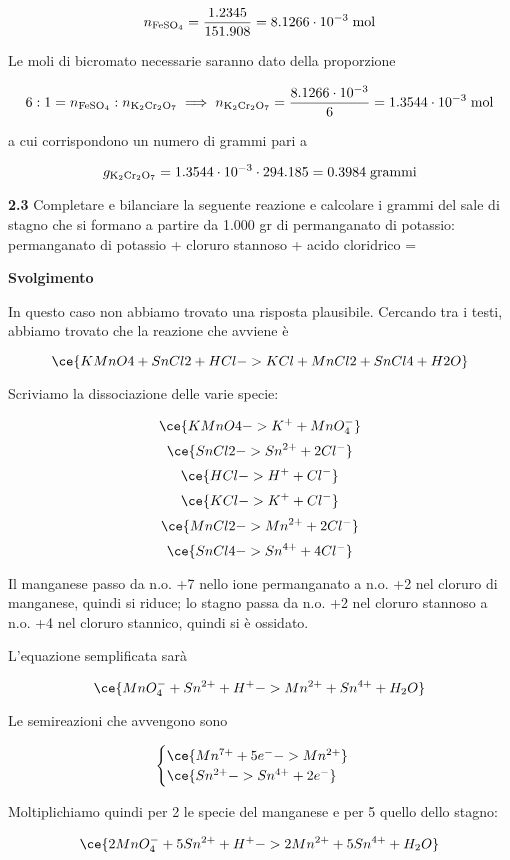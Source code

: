 $$n_{\rm FeSO_4}=\frac{1.2345}{151.908}=8.1266 \cdot 10^{-3} \; \rm mol$$

Le moli di bicromato necessarie saranno dato della proporzione

$$6:1=n_{\rm FeSO_4}:n_{\rm K_2Cr_2O_7}
\implies
n_{\rm K_2Cr_2O_7}
=\frac{8.1266 \cdot 10^{-3}}{6}
=1.3544 \cdot 10^{-3} \; \rm mol$$

a cui corrispondono un numero di grammi pari a

$$g_{\rm K_2Cr_2O_7}
=1.3544 \cdot 10^{-3} \cdot 294.185
=0.3984 \; \rm grammi$$

\vspace{0.2cm}\textbf{2.3} Completare e bilanciare la seguente reazione e calcolare i grammi del sale di stagno che si formano a partire da 1.000 gr di permanganato di potassio: 
permanganato di potassio + cloruro stannoso + acido cloridrico =

\vspace{0.2cm}\large\textbf{Svolgimento}\normalsize

\vspace{0.2cm}In questo caso non abbiamo trovato una risposta plausibile. Cercando tra i testi, abbiamo trovato che la reazione che avviene è

$$\ce{KMnO4 + SnCl2 + HCl -> KCl + MnCl2 + SnCl4 + H2O}$$

Scriviamo la dissociazione delle varie specie:

$$\ce{KMnO4 -> K^+ + MnO_4^-}$$
$$\ce{SnCl2 -> Sn^{2+} + 2Cl^-}$$
$$\ce{HCl -> H^+ + Cl^-}$$
$$\ce{KCl -> K^+ + Cl^-}$$
$$\ce{MnCl2 -> Mn^{2+} + 2Cl^-}$$
$$\ce{SnCl4 -> Sn^{4+} + 4Cl^-}$$

Il manganese passo da n.o. +7 nello ione permanganato a n.o. +2 nel cloruro di
manganese, quindi si riduce; lo stagno passa da n.o. +2 nel cloruro stannoso a n.o. +4 nel cloruro stannico, quindi si è ossidato.

L'equazione semplificata sarà

$$\ce{MnO_4^- + Sn^{2+} + H^+ -> Mn^{2+} + Sn^{4+} + H_2O}$$

Le semireazioni che avvengono sono

$$\begin{cases}
    \ce{Mn^{7+} + 5e^- -> Mn^{2+}}\\
    \ce{Sn^{2+} -> Sn^{4+} + 2e^-}
\end{cases}$$

Moltiplichiamo quindi per 2 le specie del manganese e per 5 quello dello stagno:

$$\ce{2MnO_4^- + 5Sn^{2+} + H^+ -> 2Mn^{2+} + 5Sn^{4+} + H_2O}$$


